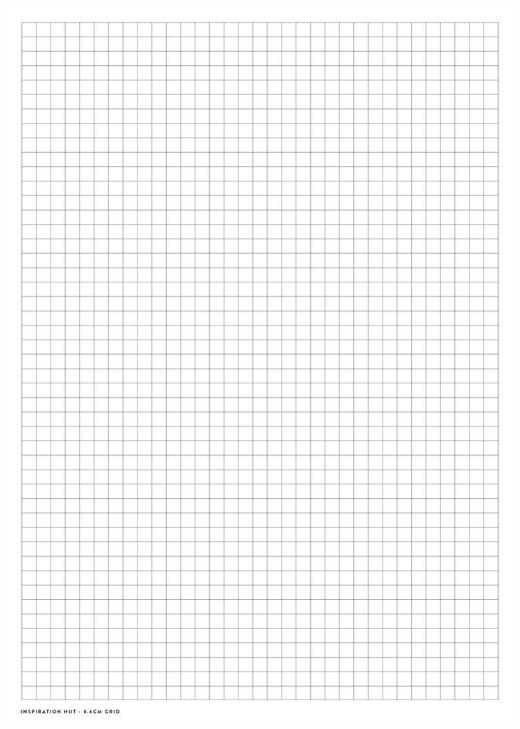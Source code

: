 \documentclass[a4paper,10pt,twocolumn,oneside]{article}
\begin{document}
\clearpage
\includegraphics[scale=0.7]{grid.jpg}
\end{document}
